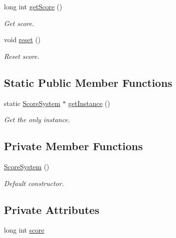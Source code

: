 \begin{DoxyCompactItemize}
\mbox{\label{class_score_system_a7a566633ab17c8687221d2786774ed50}} 
long int \mbox{\hyperlink{class_score_system_a7a566633ab17c8687221d2786774ed50}{get\+Score}} ()
\begin{DoxyCompactList}\small\item\em Get score. \end{DoxyCompactList}\item 
\mbox{\label{class_score_system_a77322e92ae6ac4605e01ab3faf994e1e}} 
void \mbox{\hyperlink{class_score_system_a77322e92ae6ac4605e01ab3faf994e1e}{reset}} ()
\begin{DoxyCompactList}\small\item\em Reset score. \end{DoxyCompactList}\end{DoxyCompactItemize}
\subsection*{Static Public Member Functions}
\begin{DoxyCompactItemize}
\item 
\mbox{\label{class_score_system_a2de6c1548fedb0226cd0cb48796e868e}} 
static \mbox{\hyperlink{class_score_system}{Score\+System}} $\ast$ \mbox{\hyperlink{class_score_system_a2de6c1548fedb0226cd0cb48796e868e}{get\+Instance}} ()
\begin{DoxyCompactList}\small\item\em Get the only instance. \end{DoxyCompactList}\end{DoxyCompactItemize}
\subsection*{Private Member Functions}
\begin{DoxyCompactItemize}
\item 
\mbox{\hyperlink{class_score_system_a00f42e35ee447789aaac42b213143297}{Score\+System}} ()
\begin{DoxyCompactList}\small\item\em Default constructor. \end{DoxyCompactList}\end{DoxyCompactItemize}
\subsection*{Private Attributes}
\begin{DoxyCompactItemize}
\item 
long int \mbox{\hyperlink{class_score_system_a0d24909986b86503fa9cc48550eaeb5e}{score}}
\end{DoxyCompactItemize}
